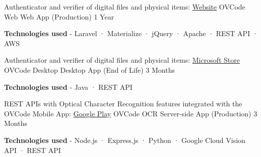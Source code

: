 \begin{cventries}
  \cventry
    {Authenticator and verifier of digital files and physical items: \href{https://ovcode.com/}{Website} } %
    {OVCode Web} %
    {Web App (Production)} %
    {1 Year} %
    {
      \begin{cvitems} %
        \item {\textbf{Technologies used} \hspace{0.03cm} - \hspace{0.03cm} Laravel \hspace{0.03cm} · \hspace{0.03cm} Materialize \hspace{0.03cm} · \hspace{0.03cm} jQuery \hspace{0.03cm} · \hspace{0.03cm} Apache \hspace{0.03cm} · \hspace{0.03cm} REST API \hspace{0.03cm} · \hspace{0.03cm} AWS \\}
      \end{cvitems}
    }
  \cventry
    {Authenticator and verifier of digital files and physical items: \href{https://www.microsoft.com/en-us/p/ovcode/9p2tlm03m56x}{Microsoft Store}} %
    {OVCode Desktop} %
    {Desktop App (End of Life)} %
    {3 Months} %
    {
      \begin{cvitems} %
        \item {\textbf{Technologies used} \hspace{0.03cm} - \hspace{0.03cm} Java \hspace{0.03cm} · \hspace{0.03cm} REST API \\}
      \end{cvitems}
    }
  \cventry
    {REST APIs with Optical Character Recognition features integrated with the OVCode Mobile App: \href{https://play.google.com/store/apps/details?id=com.nextix.ovcode}{Google Play}} %
    {OVCode OCR} %
    {Server-side App (Production)} %
    {3 Months} %
    {
      \begin{cvitems} %
        \item {\textbf{Technologies used} \hspace{0.03cm} - \hspace{0.03cm} Node.js \hspace{0.03cm} · \hspace{0.03cm} Express.js \hspace{0.03cm} · \hspace{0.03cm} Python \hspace{0.03cm} · \hspace{0.03cm} Google Cloud Vision API \hspace{0.03cm} · \hspace{0.03cm} REST API \\}

\end{cvitems}}
\end{cventries}
